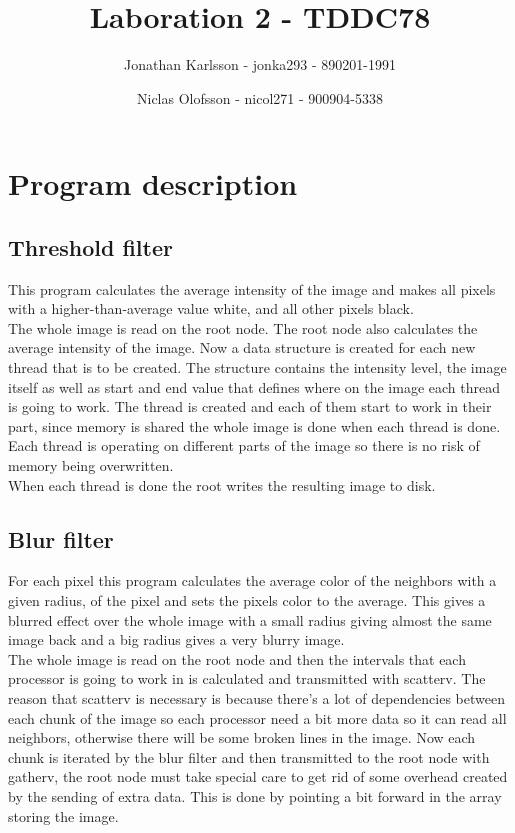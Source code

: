 \documentclass[a4paper]{article}
\author{Jonathan Karlsson - jonka293 - 890201-1991 \and Niclas Olofsson - nicol271 - 900904-5338}
\title{Laboration 2 - TDDC78}
\begin{document}
\maketitle

\section{Program description}
\subsection{Threshold filter}

This program calculates the average intensity of the image and makes all
pixels with a higher-than-average value white, and all other pixels
black.\\

The whole image is read on the root node. The root node also calculates
the  average intensity of the image. Now a data structure is created for each new thread that is to be created. The structure contains the intensity level, the image itself as well as start and end value that defines where on the image each thread is going to work. The thread is created and each of them start to work in their part, since memory is shared the whole image is done when each thread is done. Each thread is operating on different parts of the image so there is no risk of memory being overwritten.\\

When each thread is done the root writes the resulting image to disk.\\

\subsection{Blur filter}
For each pixel this program calculates the average color of the neighbors with a given radius, of the pixel and sets the pixels color to the average. This gives a blurred effect over the whole image with a small radius giving almost the same image back and a big radius gives a very blurry image.\\

The whole image is read on the root node and then the intervals that each processor is going to work in is calculated and transmitted with scatterv. The reason that scatterv is necessary is because there\rq{}s a lot of dependencies between each chunk of the image so each processor need a bit more data so it can read all neighbors, otherwise there will be some broken lines in the image. Now each chunk is iterated by the blur filter and then transmitted to the root node with gatherv, the root node must take special care to get rid of some overhead created by the sending of extra data. This is done by pointing a bit forward in the array storing the image.
\end{document}
